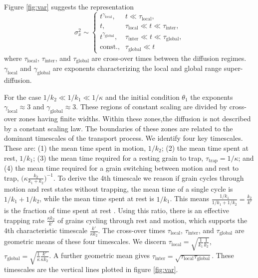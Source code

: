 \documentclass[]{agujournal2018}
\newcommand\be{\begin{equation}}
\newcommand\ee{\end{equation}}
\begin{document}
Figure \ref{fig:var} suggests the representation
\be \sigma_x^2 \sim
\begin{cases}
t^{\gamma_\text{local}}, & t\ll \tau_\text{local},\\
t, & \tau_\text{local} \ll t \ll \tau_\text{inter}, \\
t^{\gamma_\text{global}}, & \tau_\text{inter} \ll t \ll \tau_\text{global}, \\
\text{const.}, & \tau_\text{global} \ll  t
\end{cases}\ee
where $\tau_\text{local}$, $\tau_\text{inter}$, and $\tau_\text{global}$ are cross-over times between the diffusion regimes.
$\gamma_\text{local}$ and $\gamma_\text{global}$ are exponents characterizing the local and global range super-diffusion.

For the case $1/k_2 \ll 1/k_1 \ll 1/\kappa$ and the initial condition $\theta_1$ the exponents $\gamma_\text{local} \approx 3$ and $\gamma_\text{global} \approx 3$.
These regions of constant scaling are divided by cross-over zones having finite widths.
Within these zones,the diffusion is not described by a constant scaling law.
The boundaries of these zones are related to the dominant timescales of the transport process.
We identify four key timescales.
These are: (1) the mean time spent in motion, $1/k_2$; (2) the mean time spent at rest, $1/k_1$; (3) the mean time required for a resting grain to trap, $\tau_\text{trap}=1/\kappa$; and (4) the mean time required for a grain switching between motion and rest to trap, $\big(\kappa \frac{k_2}{k_1+k_2}\big)^{-1}$.
To derive the 4th timescale we reason if grain cycles through motion and rest states without trapping, the mean time of a single cycle is $1/k_1 + 1/k_2$, while the mean time spent at rest is $1/k_1$. This means $\frac{1/k_1}{1/k_1 + 1/k_2} = \frac{k_2}{k'}$ is the fraction of time spent at rest \citep[c.f.][]{Ancey2006}. Using this ratio, there is an effective trapping rate $\frac{\kappa k_2}{k'}$ of grains cycling through rest and motion, which supports the 4th characteristic timescale $\frac{k'}{\kappa k_2}$.
The cross-over times $\tau_\text{local}$, $\tau_\text{inter}$, and $\tau_\text{global}$ are geometric means of these four timescales.
We discern $\tau_\text{local} = \sqrt{\frac{1}{k_1}\frac{1}{k_2}}$, $\tau_\text{global} = \sqrt{\frac{1}{\kappa} \frac{k'}{\kappa k_2}}$.
A further geometric mean gives $\tau_\text{inter} = \sqrt{\tau_\text{local}\tau_\text{global}}$.
These timescales are the vertical lines plotted in figure \ref{fig:var}.
\end{document}
